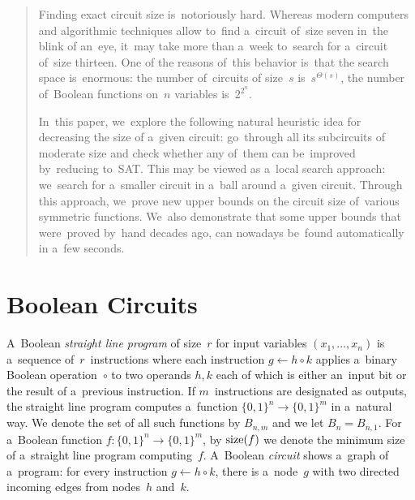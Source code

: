 \maketitle

\begin{abstract}
Finding exact circuit size
is~notoriously hard.
Whereas modern computers
and algorithmic techniques allow to~find a~circuit
of~size seven in~the blink of an~eye, it~may take more
than a~week to~search for a~circuit of~size thirteen.
One of the reasons of~this behavior is~that the search
space is~enormous: the number of~circuits of size~$s$
is~$s^{\Theta(s)}$, the number of~Boolean functions on~$n$ variables is~$2^{2^n}$.

In~this paper, we~explore the following natural
heuristic idea for decreasing the size of
a~given circuit: go~through all its subcircuits
of moderate size and check whether
any of~them can be~improved by~reducing to~SAT.
This may be viewed
as a~local search approach: we~search for a~smaller
circuit in a~ball around a~given circuit.
Through this approach, we~prove
new upper bounds on the circuit size
of~various symmetric functions. We~also demonstrate that
some upper bounds that were~proved by~hand
decades ago, can nowadays be~found automatically
in a~few seconds.
\end{abstract}





\section{Boolean Circuits}

A~Boolean \emph{straight line program}
of size~$r$ for input variables $(x_1, \dotsc, x_n)$
is a~sequence of~$r$~instructions where each
instruction $g \gets h \circ k$
applies a~binary Boolean operation~$\circ$ to
two operands $h,k$ each of which is either an~input bit
or the result of a~previous instruction.
If $m$~instructions are designated as outputs,
the straight line program computes a~function
$\{0,1\}^n \to \{0,1\}^m$ in a~natural way.
We denote the set of all such functions by $B_{n,m}$ and we let $B_n=B_{n,1}$.
For
a~Boolean function $f \colon \{0,1\}^n \to \{0,1\}^m$,
by $\operatorname{size}(f)$ we denote the minimum size of
a~straight line program
computing~$f$. A~Boolean \emph{circuit}
shows a~graph of a~program: for every instruction $g \gets h \circ k$,
there is a~node~$g$ with two directed incoming edges from nodes~$h$
and~$k$.

